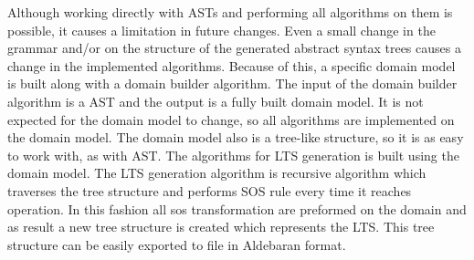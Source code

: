 Although working directly with ASTs and performing all algorithms on them is possible, it causes 
a limitation in future changes. Even a small change in the grammar and/or on the structure of the
generated abstract syntax trees causes a change in the implemented algorithms. Because of this,
a specific domain model is built along with a domain builder algorithm. The input of the domain
builder algorithm is a AST and the output is a fully built domain model. It is not expected for 
the domain model to change, so all algorithms are implemented on the domain model. The domain
model also is a tree-like structure, so it is as easy to work with, as with AST. The algorithms 
for LTS generation is built using the domain model. The LTS generation algorithm is recursive
algorithm which traverses the tree structure and performs SOS rule every time it reaches operation.
In this fashion all sos transformation are preformed on the domain and as result a new tree
structure is created which represents the LTS. This tree structure can be easily exported to file
in Aldebaran format.
\\